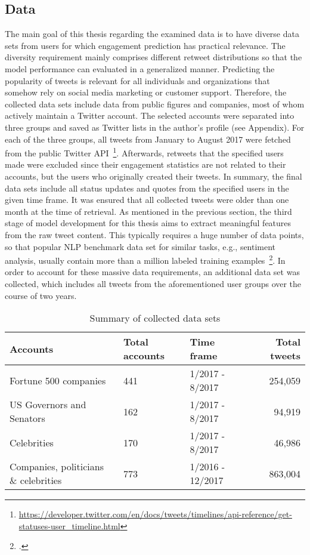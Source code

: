 \subsection{Data}
\label{sec:data_collection}

The main goal of this thesis regarding the examined data is to have diverse
data sets from users for which engagement prediction has practical relevance.
The diversity requirement mainly comprises different retweet distributions
so that the model performance can evaluated in a generalized manner.
Predicting the popularity of tweets is relevant for all individuals and
organizations that somehow rely on social media marketing or customer support.
Therefore, the collected data sets include data from public figures and
companies, most of whom actively maintain a Twitter account.
The selected accounts were separated into three groups and saved as Twitter lists
in the author's profile (see Appendix).
For each of the three groups, all tweets from January to August 2017 were
fetched from the public Twitter API~\footnote{\url{https://developer.twitter.com/en/docs/tweets/timelines/api-reference/get-statuses-user_timeline.html}}.
Afterwards, retweets that the specified users made were excluded since their
engagement statistics are not related to their accounts, but the users who
originally created their tweets.
In summary, the final data sets include all status updates and quotes from the
specified users in the given time frame.
It was ensured that all collected tweets were older than one month 
at the time of retrieval.
As mentioned in the previous section, the third stage of model development
for this thesis aims to extract meaningful features from the raw tweet content.
This typically requires a huge number of data points, so that popular NLP benchmark
data set for similar tasks, e.g., sentiment analysis, usually contain more than
a million labeled training examples~\footcite{Go2009}.
In order to account for these massive data requirements, an additional data set was
collected, which includes all tweets from the aforementioned user groups over
the course of two years.

\begin{table}
\centering
\begin{tabular}{lllr}
\toprule
  Accounts & Total accounts & Time frame & Total tweets \\
\midrule
  Fortune 500 companies & 441 & 1/2017 - 8/2017 & 254,059 \\
  US Governors and Senators & 162 & 1/2017 -  8/2017 & 94,919 \\
  Celebrities & 170 & 1/2017 - 8/2017 & 46,986 \\
  Companies, politicians \& celebrities & 773 & 1/2016 - 12/2017 & 863,004 \\
\bottomrule
\end{tabular}
\caption{Summary of collected data sets}
\label{tab:dataset_summary}
\end{table}

